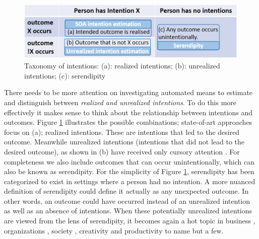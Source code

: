 \documentclass[sigconf]{acmart}
\begin{document}
\begin{figure}[tb]
    \includegraphics[width=\columnwidth]{samples/IntentQuad.png}
    \vspace{-5mm}
    \caption{Taxonomy of intentions: (a): realized intentions; (b): unrealized intentions; (c): serendipity}
    \vspace{-5mm}
    \label{fig:intent}
\end{figure}
There needs to be more attention on investigating automated means to estimate and distinguish between \emph{realized and unrealized intentions}. To do this more effectively it makes sense to think about the relationship between intentions and outcomes. Figure \ref{fig:intent} illustrates the possible combinations; state-of-art approaches focus on (a); realized intentions. These are intentions that led to the desired outcome. Meanwhile unrealized intentions (intentions that did not lead to the desired outcome), as shown in (b) have received only cursory attention \cite{wlodarczak2020breathing,Rasouli2019PIE}. For completeness we also include outcomes that can occur unintentionally, which can also be known as serendipity. For the simplicity of Figure \ref{fig:intent}, serendipity has been categorized to exist in settings where a person had no intention. A more nuanced definition of serendipity could define it actually as any unexpected outcome. In other words, an outcome could have occurred instead of an unrealized intention as well as an absence of intentions. When these potentially unrealized intentions are viewed from the lens of serendipity, it becomes again a hot topic in business \cite{Busch2020,Lane2021}, organizations \cite{eagle2004can,10.1145/2531602.2531641}, society \cite{Chan2019}, creativity and productivity \cite{gratton2020increase,meluso2020making} to name but a few. 
\end{document}
